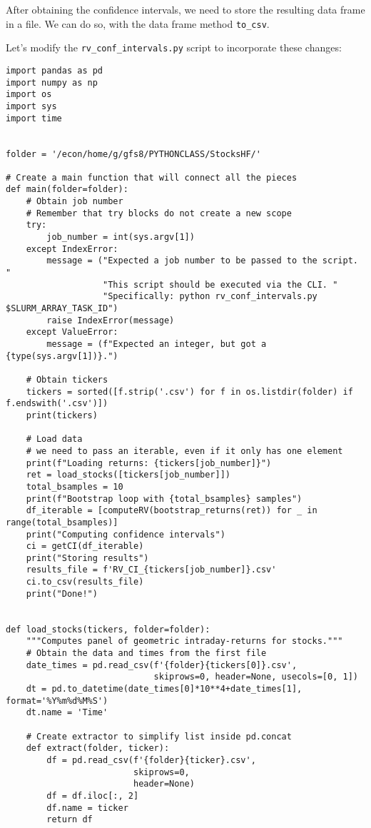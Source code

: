 \documentclass[12pt, a4paper]{article}
\begin{document}
After obtaining the confidence intervals, we need to store the resulting data frame in a file.
We can do so, with the data frame method \texttt{to\_csv}.

Let's modify the \texttt{rv\_conf\_intervals.py} script to incorporate these changes:
\lstset{language=jupyter-python,label= ,caption= ,captionpos=b,numbers=none}
\begin{lstlisting}
import pandas as pd
import numpy as np
import os
import sys
import time


folder = '/econ/home/g/gfs8/PYTHONCLASS/StocksHF/'

# Create a main function that will connect all the pieces
def main(folder=folder):
    # Obtain job number
    # Remember that try blocks do not create a new scope
    try:
        job_number = int(sys.argv[1])
    except IndexError:
        message = ("Expected a job number to be passed to the script. "
                   "This script should be executed via the CLI. "
                   "Specifically: python rv_conf_intervals.py $SLURM_ARRAY_TASK_ID")
        raise IndexError(message)
    except ValueError:
        message = (f"Expected an integer, but got a {type(sys.argv[1])}.")

    # Obtain tickers
    tickers = sorted([f.strip('.csv') for f in os.listdir(folder) if f.endswith('.csv')])
    print(tickers)

    # Load data
    # we need to pass an iterable, even if it only has one element
    print(f"Loading returns: {tickers[job_number]}")
    ret = load_stocks([tickers[job_number]])
    total_bsamples = 10
    print(f"Bootstrap loop with {total_bsamples} samples")
    df_iterable = [computeRV(bootstrap_returns(ret)) for _ in range(total_bsamples)]
    print("Computing confidence intervals")
    ci = getCI(df_iterable)
    print("Storing results")
    results_file = f'RV_CI_{tickers[job_number]}.csv'
    ci.to_csv(results_file)
    print("Done!")


def load_stocks(tickers, folder=folder):
    """Computes panel of geometric intraday-returns for stocks."""
    # Obtain the data and times from the first file
    date_times = pd.read_csv(f'{folder}{tickers[0]}.csv',
                             skiprows=0, header=None, usecols=[0, 1])
    dt = pd.to_datetime(date_times[0]*10**4+date_times[1], format='%Y%m%d%M%S')
    dt.name = 'Time'

    # Create extractor to simplify list inside pd.concat
    def extract(folder, ticker):
        df = pd.read_csv(f'{folder}{ticker}.csv',
                         skiprows=0,
                         header=None)
        df = df.iloc[:, 2]
        df.name = ticker
        return df


\end{lstlisting}
\end{document}
